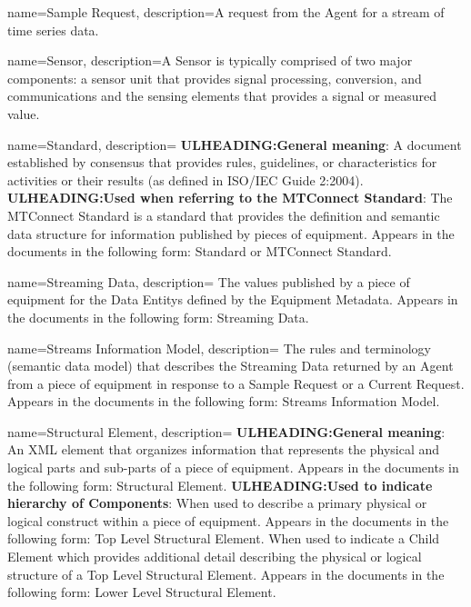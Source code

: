 {
    name={Sample Request},
	description={A request from the \gls{Agent} for a stream of time series data.}
}

{
    name={Sensor},
	description={A \gls{Sensor} is typically comprised of two major components: a \gls{sensor unit} that provides signal processing, conversion, and communications and the \glspl{sensing element} that provides a signal or measured value.}
}

{
    name={Standard},
	description={
	\textbf{ULHEADING:General meaning}:
	A document established by consensus that provides rules, guidelines, or characteristics for activities or their results (as defined in ISO/IEC Guide 2:2004).
	\textbf{ULHEADING:Used when referring to the MTConnect Standard}: 
	The MTConnect Standard is a standard that provides the definition and semantic data structure for information published by pieces of equipment.
	Appears in the documents in the following form: Standard or MTConnect Standard.
}
}

{
    name={Streaming Data},
	description={
	The values published by a piece of equipment for the \glspl{Data Entity} defined by the \gls{Equipment Metadata}.
	Appears in the documents in the following form: \gls{Streaming Data}.
}
}

{
    name={Streams Information Model},
	description={
	The rules and terminology (\gls{semantic data model}) that describes the \gls{Streaming Data} returned by an \gls{Agent} from a piece of equipment in response to a \gls{Sample Request} or a \gls{Current Request}.
	Appears in the documents in the following form: \gls{Streams Information Model}.
}
}

{
    name={Structural Element},
	description={
	\textbf{ULHEADING:General meaning}:
	An XML element that organizes information that represents the physical and logical parts and sub-parts of a piece of equipment.
	Appears in the documents in the following form: \gls{Structural Element}.
	\textbf{ULHEADING:Used to indicate hierarchy of Components}:
	When used to describe a primary physical or logical construct within a piece of equipment. 
	Appears in the documents in the following form: \gls{Top Level} \gls{Structural Element}.
	When used to indicate a \gls{Child Element} which provides additional detail describing the physical or logical structure of a \gls{Top Level} \gls{Structural Element}.
	Appears in the documents in the following form: \gls{Lower Level} \gls{Structural Element}.
}
}

